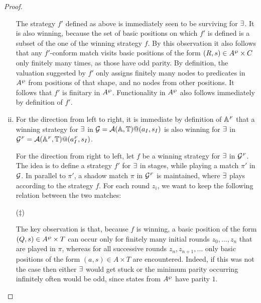 \begin{proof}
\begin{enumerate}[(i)]
\begin{enumerate}[label=(\alph*),ref=\alph*]
      \end{enumerate}
      The strategy $f'$ defined as above is immediately seen to be
      surviving for $\exists$. It is also winning, because the set of
      basic positions on which $f'$ is defined is a subset of the one
      of the winning strategy $f$. By this observation it also follows that any $f'$-conform match visits basic positions of the form $(R,s) \in A^{\wp} \times C$ only finitely many times, as those have odd parity. By definition, the valuation suggested by $f'$ only assigns finitely many nodes to predicates in $A^{\wp}$ from positions of that shape, and no nodes from other positions. It follows that $f'$ is finitary in $A^{\wp}$. Functionality in $A^{\wp}$ also follows immediately by definition of $f'$.
  \item For the direction from left to right, it is immediate by definition of $\mathbb{A}^{{\scriptscriptstyle F}}$ that a winning strategy for $\exists$ in $\mathcal{G} = \mathcal{A}(\mathbb{A},\mathbb{T})@(a_I,s_I)$ is also winning for $\exists$ in $\mathcal{G}^{{\scriptscriptstyle F}} = \mathcal{A}(\mathbb{A}^{{\scriptscriptstyle F}},\mathbb{T})@(a_I^{{\scriptscriptstyle F}},s_I)$.

      For the direction from right to left, let $f$ be a winning strategy for $\exists$ in $\mathcal{G}^{{\scriptscriptstyle F}}$. The idea is to define a strategy $f'$ for $\exists$ in stages, while playing a match $\pi'$ in $\mathcal{G}$. In parallel to $\pi'$, a shadow match $\pi$ in $\mathcal{G}^{{\scriptscriptstyle F}}$ is maintained, where $\exists$ plays according to the strategy $f$. For each round $z_i$, we want to keep the following relation between the two matches:
\smallskip
\begin{center}
\hspace*{0.3cm}($\ddag$)
\end{center}
\smallskip
The key observation is that, because $f$ is winning, a basic position of the form $(Q,s) \in A^{\wp} \times T$ can occur only for finitely many initial rounds $z_0,\dots,z_n$ that are played in $\pi$, whereas for all successive rounds $z_n,z_{n+1},\dots$ only basic positions of the form $(a,s) \in A \times T$ are encountered. Indeed, if this was not the case then either $\exists$ would get stuck or the minimum parity occurring infinitely often would be odd, since states from $A^{\wp}$ have parity $1$.


\end{enumerate}
\end{proof}
